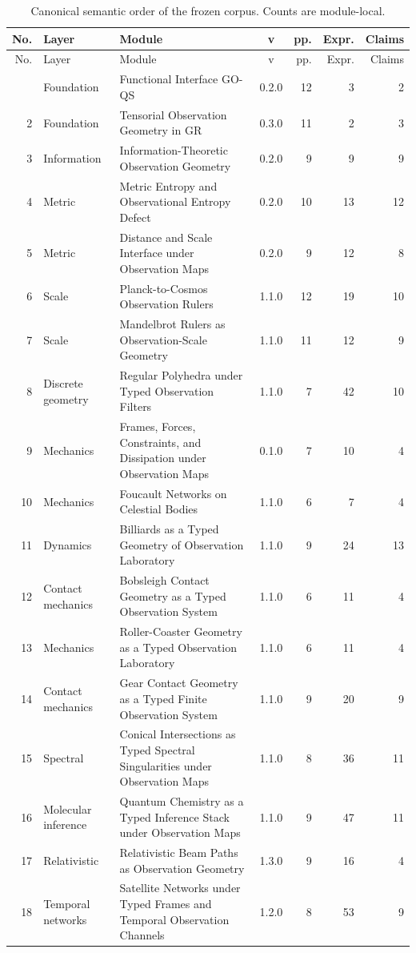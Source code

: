 \begin{longtable}{@{}r L{23mm} L{67mm} c r r r@{}}
\caption{Canonical semantic order of the frozen corpus. Counts are module-local.}\label{tab:module-catalog}\\
\toprule
No. & Layer & Module & v & pp. & Expr. & Claims\\
\midrule
\endfirsthead
\toprule
No. & Layer & Module & v & pp. & Expr. & Claims\\
\midrule
\endhead
\bottomrule
{} & Foundation & Functional Interface GO-QS & 0.2.0 & 12 & 3 & 2\\
2 & Foundation & Tensorial Observation Geometry in GR & 0.3.0 & 11 & 2 & 3\\
3 & Information & Information-Theoretic Observation Geometry & 0.2.0 & 9 & 9 & 9\\
4 & Metric & Metric Entropy and Observational Entropy Defect & 0.2.0 & 10 & 13 & 12\\
5 & Metric & Distance and Scale Interface under Observation Maps & 0.2.0 & 9 & 12 & 8\\
6 & Scale & Planck-to-Cosmos Observation Rulers & 1.1.0 & 12 & 19 & 10\\
7 & Scale & Mandelbrot Rulers as Observation-Scale Geometry & 1.1.0 & 11 & 12 & 9\\
8 & Discrete geometry & Regular Polyhedra under Typed Observation Filters & 1.1.0 & 7 & 42 & 10\\
9 & Mechanics & Frames, Forces, Constraints, and Dissipation under Observation Maps & 0.1.0 & 7 & 10 & 4\\
10 & Mechanics & Foucault Networks on Celestial Bodies & 1.1.0 & 6 & 7 & 4\\
11 & Dynamics & Billiards as a Typed Geometry of Observation Laboratory & 1.1.0 & 9 & 24 & 13\\
12 & Contact mechanics & Bobsleigh Contact Geometry as a Typed Observation System & 1.1.0 & 6 & 11 & 4\\
13 & Mechanics & Roller-Coaster Geometry as a Typed Observation Laboratory & 1.1.0 & 6 & 11 & 4\\
14 & Contact mechanics & Gear Contact Geometry as a Typed Finite Observation System & 1.1.0 & 9 & 20 & 9\\
15 & Spectral & Conical Intersections as Typed Spectral Singularities under Observation Maps & 1.1.0 & 8 & 36 & 11\\
16 & Molecular inference & Quantum Chemistry as a Typed Inference Stack under Observation Maps & 1.1.0 & 9 & 47 & 11\\
17 & Relativistic & Relativistic Beam Paths as Observation Geometry & 1.3.0 & 9 & 16 & 4\\
18 & Temporal networks & Satellite Networks under Typed Frames and Temporal Observation Channels & 1.2.0 & 8 & 53 & 9\\
\end{longtable}
